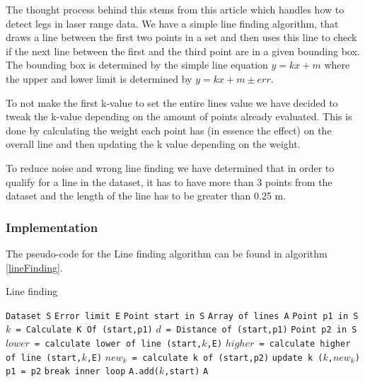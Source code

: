 \documentclass[a4paper, 10pt, conference]{ieeeconf}      %
\begin{document}
The thought process behind this stems from this article \cite{legfinding} which handles how to detect legs in laser range data. We have a simple line finding algorithm, that draws a line between the first two points in a set and then uses this line to check if the next line between the first and the third point are in a given bounding box. The bounding box is determined by the simple line equation $y = kx + m$ where the upper and lower limit is determined by $y = kx + m \pm err$. 

To not make the first k-value to set the entire lines value we have decided to tweak the k-value depending on the amount of points already evaluated. This is done by calculating the weight each point has (in essence the effect) on the overall line and then updating the k value depending on the weight.

To reduce noise and wrong line finding we have determined that in order to qualify for a line in the dataset, it has to have more than 3 points from the dataset and the length of the line has to be greater than 0.25 m.
\subsubsection{Implementation}
The pseudo-code for the Line finding algorithm can be found in algorithm \ref{lineFinding}.

\begin{algorithm}
  \caption{\label{lineFinding}Line finding}
  \begin{algorithmic}[1]
      \State \texttt{Dataset S}
      \State \texttt{Error limit E}
      \State \texttt{Point start in S}
      \State \texttt{Array of lines A}
      	\State \texttt{Point p1 in S}
      	\State \texttt{$k$ = Calculate K Of (start,p1)}
      	\State \texttt{$d$ = Distance of (start,p1)}
      		\State \texttt{Point p2 in S}
      		\State \texttt{$lower$ = calculate lower of line (start,$k$,E)}
      		\State \texttt{$higher$ = calculate higher of line (start,$k$,E)}
      			\State \texttt{$new_k$ = calculate k of (start,p2)}
      			\State \texttt{update k ($k$,$new_k$)}
      			\State \texttt{p1 = p2}
      		\Else
      			\State \texttt{break inner loop}
      		\EndIf
      	\EndWhile
      		\State \texttt{A.add($k$,start)}
      	\EndIf
      \EndWhile
      \Return \texttt{A}
  \end{algorithmic}
\end{algorithm}
\end{document}

